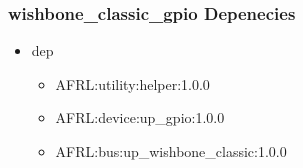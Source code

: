 \subsubsection{wishbone\_classic\_gpio Depenecies}
\begin{itemize}
\item dep
	\begin{itemize}
	\item AFRL:utility:helper:1.0.0
	\item AFRL:device:up\_gpio:1.0.0
	\item AFRL:bus:up\_wishbone\_classic:1.0.0
	\end{itemize}
\end{itemize}
